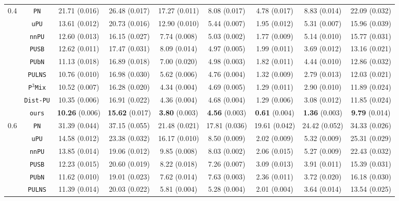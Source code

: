 \documentclass[sigconf]{acmart}
\begin{document}
\begin{table*}[htbp]
\begin{tabular}{ccccccccc}
        \hline
        \multirow{9}{*}{0.4} & \texttt{PN} & 21.71 (0.016) & 26.48 (0.017) & 17.27 (0.011) & 8.08 (0.017) & 4.78 (0.017) & 8.83 (0.014) & 22.09 (0.032)\\
        & \texttt{uPU} & 13.61 (0.012) & 20.73 (0.016) & 12.90 (0.010) & 5.44 (0.007) & 1.95 (0.012) & 5.31 (0.007) & 15.96 (0.039)\\
        & \texttt{nnPU} & 12.60 (0.013) & 16.15 (0.027) & 7.74 (0.008) & 5.03 (0.002) & 1.77 (0.009) & 5.14 (0.010) & 15.77 (0.031)\\
        & \texttt{PUSB} & 12.62 (0.011) & 17.47 (0.031) & 8.09 (0.014) & 4.97 (0.005) & 1.99 (0.011) & 3.69 (0.012) & 13.16 (0.021)\\
        & \texttt{PUbN} & 11.13 (0.018) & 16.89 (0.018) & 7.00 (0.020) & 4.98 (0.003) & 1.82 (0.011) & 4.44 (0.010) & 12.86 (0.032)\\
        & \texttt{PULNS} & 10.76 (0.010) & 16.98 (0.030) & 5.62 (0.006) & 4.76 (0.004) & 1.32 (0.009) & 2.79 (0.013) & 12.03 (0.021)\\
        & \texttt{P$^3$Mix} & 10.52 (0.007) & 16.28 (0.020) & 4.34 (0.004) & 4.69 (0.005) & 1.29 (0.011) & 2.90 (0.010) & 11.89 (0.024)\\
        & \texttt{Dist-PU} & 10.35 (0.006) & 16.91 (0.022) & 4.36 (0.004) & 4.68 (0.004) & 1.29 (0.006) & 3.08 (0.012) & 11.85 (0.024)\\
        & \texttt{ours} & \textbf{10.26} (0.006) & \textbf{15.62} (0.017) & \textbf{3.80} (0.003) & \textbf{4.56} (0.003) & \textbf{0.61} (0.004) & \textbf{1.36} (0.003) & \textbf{9.79} (0.014)\\
        \hline
        \multirow{9}{*}{0.6} & \texttt{PN} & 31.39 (0.044) & 37.15 (0.055) & 21.48 (0.021) & 17.81 (0.036) & 19.61 (0.042) & 24.42 (0.052)& 34.33 (0.026)\\
        & \texttt{uPU} & 14.58 (0.012) & 23.38 (0.032) & 16.17 (0.010) & 8.50 (0.009) & 2.02 (0.009) & 5.32 (0.009) & 25.31 (0.029)\\
        & \texttt{nnPU} & 13.85 (0.014) & 19.06 (0.012) & 9.85 (0.008) & 8.03 (0.002) & 2.06 (0.015) & 5.27 (0.009) & 22.43 (0.032)\\
        & \texttt{PUSB} & 12.23 (0.015) & 20.60 (0.019) & 8.22 (0.018) & 7.26 (0.007) & 3.09 (0.013) & 3.91 (0.011) & 15.39 (0.031)\\
        & \texttt{PUbN} & 11.62 (0.010) & 19.01 (0.023) & 7.62 (0.014) & 7.63 (0.003) & 2.36 (0.011) & 3.72 (0.020) & 16.18 (0.030)\\
        & \texttt{PULNS} & 11.39 (0.014) & 20.03 (0.022) & 5.81 (0.004) & 5.28 (0.004) & 2.01 (0.004) & 3.64 (0.014) & 13.54 (0.025)\\

\end{tabular}
\end{table*}
\end{document}
